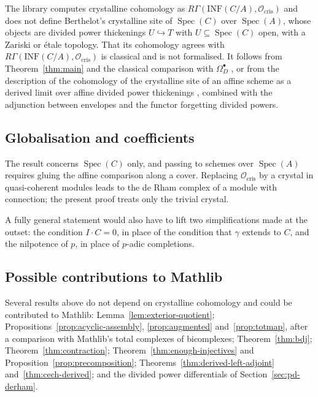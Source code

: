 \documentclass[11pt]{amsart}
\newcommand{\spa}{\medskip}
\newcommand{\Ocris}{\mathcal{O}_{\mathrm{cris}}}
\DeclareMathOperator{\Spec}{Spec}
\newcommand{\INF}{\mathrm{INF}}
\theoremstyle{plain}
\theoremstyle{definition}
\theoremstyle{remark}
\begin{document}
The library computes crystalline cohomology as $R\Gamma(\INF(C/A), \Ocris)$ and does not define Berthelot's crystalline site of $\Spec(C)$ over $\Spec(A)$, whose objects are divided power thickenings $U \hookrightarrow T$ with $U \subseteq \Spec(C)$ open, with a Zariski or étale topology. That its cohomology agrees with $R\Gamma(\INF(C/A), \Ocris)$ is classical and is not formalised. It follows from Theorem~\ref{thm:main} and the classical comparison with $\Omega^\bullet_D$ \cite[Tag~07LG]{stacks}, or from the description of the cohomology of the crystalline site of an affine scheme as a derived limit over affine divided power thickenings \cite[Tag~07JK]{stacks}, combined with the adjunction between envelopes and the functor forgetting divided powers.

\subsection{Globalisation and coefficients}

The result concerns $\Spec(C)$ only, and passing to schemes over $\Spec(A)$ requires gluing the affine comparison along a cover. Replacing $\Ocris$ by a crystal in quasi-coherent modules leads to the de Rham complex of a module with connection; the present proof treats only the trivial crystal.

\spa

A fully general statement would also have to lift two simplifications made at the outset: the condition $I \cdot C = 0$, in place of the condition that $\gamma$ extends to $C$, and the nilpotence of $p$, in place of $p$-adic completions.

\subsection{Possible contributions to Mathlib}

Several results above do not depend on crystalline cohomology and could be contributed to Mathlib: Lemma~\ref{lem:exterior-quotient}; Propositions~\ref{prop:acyclic-assembly}, \ref{prop:augmented} and~\ref{prop:totmap}, after a comparison with Mathlib's total complexes of bicomplexes; Theorem~\ref{thm:bdj}; Theorem~\ref{thm:contraction}; Theorem~\ref{thm:enough-injectives} and Proposition~\ref{prop:precomposition}; Theorems~\ref{thm:derived-left-adjoint} and~\ref{thm:cech-derived}; and the divided power differentials of Section~\ref{sec:pd-derham}.

\end{document}
